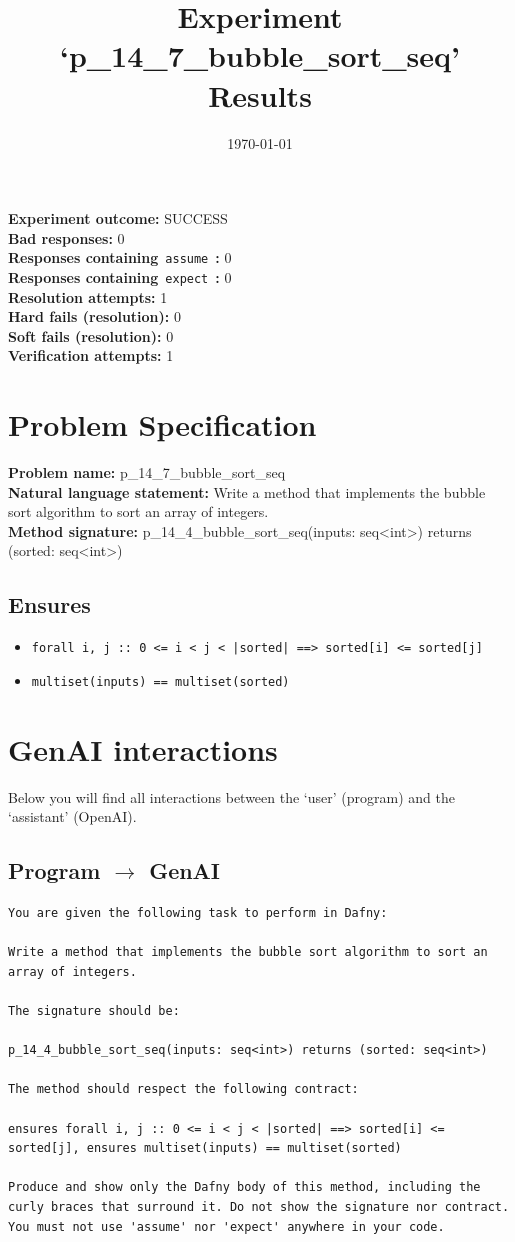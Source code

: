 \documentclass{article}
\begin{document}
\title{Experiment `p\_14\_7\_bubble\_sort\_seq' Results}
\author{\today}
\date{}
\maketitle
\textbf{Experiment outcome: }SUCCESS
\\\textbf{Bad responses: }0
\\\textbf{Responses containing}~\texttt{assume}~\textbf{: }0
\\\textbf{Responses containing}~\texttt{expect}~\textbf{: }0
\\\textbf{Resolution attempts: }1
\\\textbf{Hard fails (resolution): }0
\\\textbf{Soft fails (resolution): }0
\\\textbf{Verification attempts: }1
\section*{Problem Specification}
\textbf{Problem name: }p\_14\_7\_bubble\_sort\_seq
\\\textbf{Natural language statement: }Write a method that implements the bubble sort algorithm to sort an array of integers.
\\\textbf{Method signature: }p\_14\_4\_bubble\_sort\_seq(inputs: seq<int>) returns (sorted: seq<int>)
\subsection*{Ensures}
\begin{itemize}
\item \texttt{forall i, j :: 0 <= i < j < |sorted| ==> sorted[i] <= sorted[j]}
\item \texttt{multiset(inputs) == multiset(sorted)}
\end{itemize}
\clearpage
\section*{GenAI interactions}
Below you will find all interactions between the `user' (program) and the `assistant' (OpenAI).
\subsection*{Program $\rightarrow$ GenAI}
\begin{lstlisting}
You are given the following task to perform in Dafny:

Write a method that implements the bubble sort algorithm to sort an array of integers.

The signature should be:

p_14_4_bubble_sort_seq(inputs: seq<int>) returns (sorted: seq<int>)

The method should respect the following contract:

ensures forall i, j :: 0 <= i < j < |sorted| ==> sorted[i] <= sorted[j], ensures multiset(inputs) == multiset(sorted)

Produce and show only the Dafny body of this method, including the curly braces that surround it. Do not show the signature nor contract. You must not use 'assume' nor 'expect' anywhere in your code.
\end{lstlisting}
\end{document}
